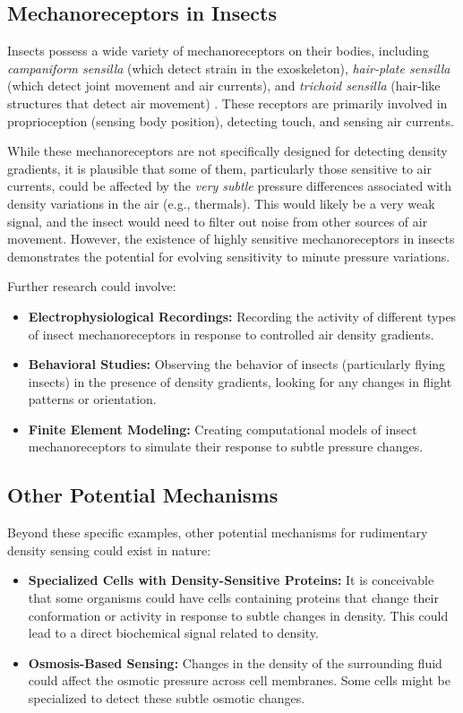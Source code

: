 \documentclass[11pt]{article}
\begin{document}
\subsection{Mechanoreceptors in Insects}

Insects possess a wide variety of mechanoreceptors on their bodies, including \textit{campaniform sensilla} (which detect strain in the exoskeleton), \textit{hair-plate sensilla} (which detect joint movement and air currents), and \textit{trichoid sensilla} (hair-like structures that detect air movement) \cite{Keil1997InsectMechanoreceptors}. These receptors are primarily involved in proprioception (sensing body position), detecting touch, and sensing air currents.

While these mechanoreceptors are not specifically designed for detecting density gradients, it is plausible that some of them, particularly those sensitive to air currents, could be affected by the \textit{very subtle} pressure differences associated with density variations in the air (e.g., thermals). This would likely be a very weak signal, and the insect would need to filter out noise from other sources of air movement. However, the existence of highly sensitive mechanoreceptors in insects demonstrates the potential for evolving sensitivity to minute pressure variations.

Further research could involve:
\begin{itemize}
    \item \textbf{Electrophysiological Recordings:} Recording the activity of different types of insect mechanoreceptors in response to controlled air density gradients.
    \item \textbf{Behavioral Studies:} Observing the behavior of insects (particularly flying insects) in the presence of density gradients, looking for any changes in flight patterns or orientation.
    \item \textbf{Finite Element Modeling:} Creating computational models of insect mechanoreceptors to simulate their response to subtle pressure changes.
\end{itemize}

\subsection{Other Potential Mechanisms}

Beyond these specific examples, other potential mechanisms for rudimentary density sensing could exist in nature:
\begin{itemize}
    \item \textbf{Specialized Cells with Density-Sensitive Proteins:} It is conceivable that some organisms could have cells containing proteins that change their conformation or activity in response to subtle changes in density. This could lead to a direct biochemical signal related to density.
    \item \textbf{Osmosis-Based Sensing:} Changes in the density of the surrounding fluid could affect the osmotic pressure across cell membranes. Some cells might be specialized to detect these subtle osmotic changes.
\end{itemize}
\end{document}
